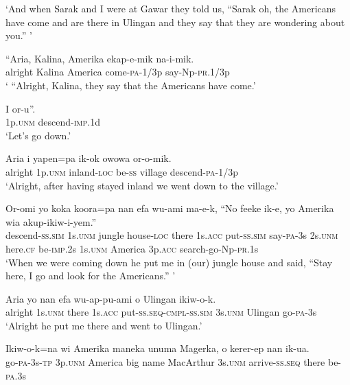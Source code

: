 \glt ‘And when Sarak and I were at Gawar they told us, “Sarak oh, the Americans have come and are there in Ulingan and they say that they are wondering about you.” ’ \\
\z


\ea
\gll  “Aria,  Kalina,  Amerika  ekap-e-mik  na-i-mik. \\
alright  Kalina  America  come-\textsc{pa}-1/3p  say-Np-\textsc{pr}.1/3p \\
\glt ‘ “Alright, Kalina, they say that the Americans have come.’ \\
\z


\ea
\gll  I  or-u”. \\
1p.\textsc{unm}  descend-\textsc{imp}.1d \\
\glt ‘Let’s go down.’ \\
\z


\ea
\gll  Aria  i  yapen=pa  ik-ok  owowa  or-o-mik. \\
alright  1p.\textsc{unm}  inland-\textsc{loc}  be-\textsc{ss}  village  descend-\textsc{pa}-1/3p \\
\glt ‘Alright, after having stayed inland we went down to the village.’ \\
\z


\ea
\gll  Or-omi  yo  koka  koora=pa  nan  efa               wu-ami  ma-e-k,  “No  feeke  ik-e,  yo  Amerika                   wia  akup-ikiw-i-yem.” \\
descend-\textsc{ss}.\textsc{sim}  1s.\textsc{unm}  jungle  house-\textsc{loc}  there  1s.\textsc{acc} put-\textsc{ss}.\textsc{sim}  say-\textsc{pa}-3s  2s.\textsc{unm}  here.\textsc{cf}  be-\textsc{imp}.2s  1s.\textsc{unm} America  3p.\textsc{acc}  search-go-Np-\textsc{pr}.1s \\


\glt ‘When we were coming down he put me in (our) jungle house and said, “Stay here, I go and look for the Americans.” ’ \\
\z


\ea
\gll  Aria  yo  nan  efa  wu-ap-pu-ami                  o  Ulingan  ikiw-o-k. \\
alright  1s.\textsc{unm}  there  1s.\textsc{acc}  put-\textsc{ss.seq}-\textsc{cmpl}-\textsc{ss}.\textsc{sim}  3s.\textsc{unm}  Ulingan  go-\textsc{pa}-3s \\


\glt ‘Alright he put me there and went to Ulingan.’ \\
\z


\ea
\gll  Ikiw-o-k=na  wi  Amerika  maneka  unuma  Magerka,  o  kerer-ep  nan  ik-ua. \\
go-\textsc{pa}-3s-\textsc{tp}  3p.\textsc{unm}  America  big  name  MacArthur       3s.\textsc{unm}  arrive-\textsc{ss.seq}  there  be-\textsc{pa}.3s \\


